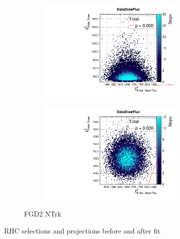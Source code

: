 \begin{figure}[h]
\begin{subfigure}[t]{\textwidth}
\begin{subfigure}[t]{0.24\textwidth}
\includegraphics[width=\textwidth, trim={0mm 0mm 0mm 8mm}, clip,page=128]{figures/mach3/data/priorpred/2017b_NewDet_3Xsec_4Det_5Flux_NewXSecTune_Data_merge_PriorPred_procs}
\end{subfigure}
\begin{subfigure}[t]{0.24\textwidth}
	\includegraphics[width=\textwidth, trim={0mm 0mm 0mm 8mm}, clip,page=128]{figures/mach3/data/postpred/2017b_NewData_NewDet_UpdXsecStep_2Xsec_4Det_5Flux_0_PostPred_procs}
\end{subfigure}
\caption{FGD2 NTrk \numubar}
\end{subfigure}
	\caption{RHC \numu selections \pmu and \cosmu projections before and after fit}
	\label{fig:rhc_nu_postfit}
\end{figure}

